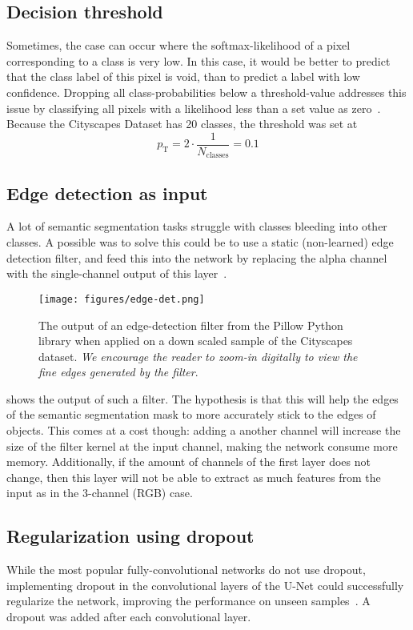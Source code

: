 \subsection{Decision threshold}
Sometimes, the case can occur where the softmax-likelihood of a pixel corresponding to a class is very low. 
In this case, it would be better to predict that the class label of this pixel is void, than to predict a label with low confidence.
Dropping all class-probabilities below a threshold-value addresses this issue by classifying all pixels with a likelihood less than a set value as zero~\cite{Li_2017_CVPR}.
Because the Cityscapes Dataset has 20 classes, the threshold was set at 
\begin{equation}
    p_\mathrm{T} = 2 \cdot \frac{1}{N_\mathrm{classes}} = 0.1
\end{equation} 


\subsection{Edge detection as input}
A lot of semantic segmentation tasks struggle with classes bleeding into other classes. 
A possible was to solve this could be to use a static (non-learned) edge detection filter, 
and feed this into the network by replacing the alpha channel with the single-channel output of this layer~\cite{DBLP:journals/corr/ChenBPMY15}.

\begin{figure}
	\centering
	\texttt{[image: figures/edge-det.png]}
	\caption{The output of an edge-detection filter from the Pillow Python library when applied on a down scaled sample of the Cityscapes dataset. \textit{We encourage the reader to zoom-in digitally to view the fine edges generated by the filter}.}
	\label{fig:meth-edge-det}
\end{figure}

 shows the output of such a filter. The hypothesis is that this will help the edges of the semantic segmentation mask to more accurately stick to the edges of objects. This comes at a cost though: adding a another channel will increase the size of the filter kernel at the input channel, making the network consume more memory. Additionally, if the amount of channels of the first layer does not change, then this layer will not be able to extract as much features from the input as in the 3-channel (RGB) case.

\subsection{Regularization using dropout}
While the most popular fully-convolutional networks do not use dropout, implementing dropout in the convolutional layers of the U-Net could successfully regularize the network, improving the performance on unseen samples~\cite{Spilsbury2019DontID}. 
A dropout was added after each convolutional layer.

